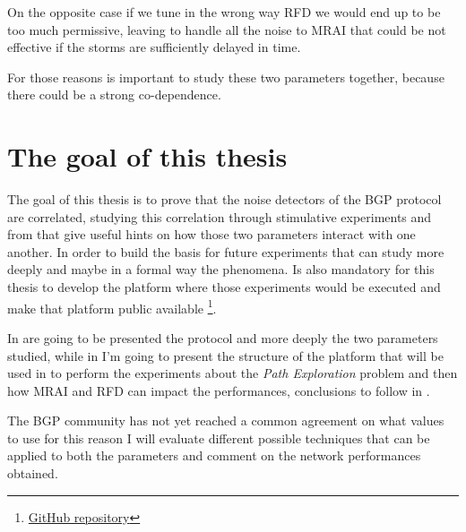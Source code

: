 On the opposite case if we tune in the wrong way \ac{RFD} we would end up to
be too much permissive, leaving to handle all the noise to \ac{MRAI} that could
be not effective if the storms are sufficiently delayed in time.

For those reasons is important to study these two parameters together, because
there could be a strong co-dependence.

\section{The goal of this thesis}
\label{sec:thesis_goal}


The goal of this thesis is to prove that the noise detectors of the \ac{BGP} 
protocol are correlated, studying this correlation through stimulative experiments
and from that give useful hints on how those two parameters interact with one another.
In order to build the basis for future experiments that can study more deeply 
and maybe in a formal way the phenomena.
Is also mandatory for this thesis to develop the platform where those experiments
would be executed and make that platform public available
\footnote{\href{https://github.com/tiamilani/BGPFSM}{GitHub repository}}.

In  are going to be presented the protocol and more deeply
the two parameters studied, while in  I'm going to present
the structure of the platform that will be used in  
to perform the experiments about the \textit{Path Exploration} problem and then
how \ac{MRAI} and \ac{RFD} can impact the performances, conclusions to follow
in .

The \ac{BGP} community has not yet reached a common agreement on what values 
to use for this reason I will evaluate different possible techniques that can 
be applied to both the parameters and comment on the network performances obtained.
 